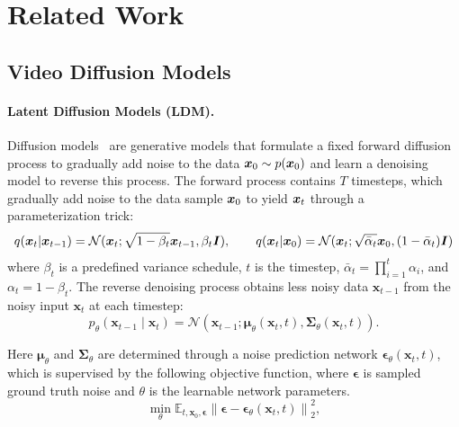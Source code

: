 \section{Related Work}

\subsection{Video Diffusion Models}

\paragraph{Latent Diffusion Models (LDM).} 
Diffusion models~\citep{sohldickstein2015deep,ddpm} are generative models that formulate a fixed forward diffusion process to gradually add noise to the data $\boldsymbol{x}_0 \sim p(\boldsymbol{x}_0)$ and learn a denoising model to reverse this process. 
The forward process contains $T$ timesteps, which gradually add noise to the data sample $\boldsymbol{x}_0$ to yield $\boldsymbol{x}_t$ through a parameterization trick:
%
\begin{equation}
q(\boldsymbol{x}_t|\boldsymbol{x}_{t-1}) = \mathcal{N}(\boldsymbol{x}_t;\sqrt{1-\beta_t}\boldsymbol{x}_{t-1},\beta_t \boldsymbol{I}), \qquad q(\boldsymbol{x}_t|\boldsymbol{x}_0) = \mathcal{N}(\boldsymbol{x}_t; \sqrt{\bar\alpha_t}\boldsymbol{x}_0, (1-\bar\alpha_t)\boldsymbol{I}) 
\end{equation}
%
where $\beta_t$ is a predefined variance schedule, $t$ is the timestep, $\bar\alpha_t = \prod_{i=1}^t \alpha_i$, and $\alpha_t = 1-\beta_t$.
The reverse denoising process obtains less noisy data $\boldsymbol{x}_{t-1}$ from the noisy input $\boldsymbol{x}_t$ at each timestep:
%
\begin{equation}
p_\theta\left(\boldsymbol{x}_{t-1} \mid \boldsymbol{x}_t\right)=\mathcal{N}\left(\boldsymbol{x}_{t-1} ; \boldsymbol{\mu}_\theta\left(\boldsymbol{x}_t, t\right), \boldsymbol{\Sigma}_\theta\left(\boldsymbol{x}_t, t\right)\right).
\end{equation}

Here $\boldsymbol{\mu}_\theta$ and $\boldsymbol{\Sigma}_\theta$ are determined through a noise prediction network $\boldsymbol{\epsilon}_{\theta}\left(\boldsymbol{x}_t, t\right)$, which is supervised by the following objective function, where $\boldsymbol{\epsilon}$ is sampled ground truth noise and $\theta$ is the learnable network parameters.
\begin{equation}
\min _{\theta} \mathbb{E}_{t, \boldsymbol{x}_0, \boldsymbol{\epsilon}}\left\|\boldsymbol{\epsilon}-\boldsymbol{\epsilon}_{\theta}\left(\boldsymbol{x}_t, t\right)\right\|_2^2,
\end{equation}

